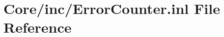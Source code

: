 \hypertarget{_error_counter_8inl}{}\section{Core/inc/\+Error\+Counter.inl File Reference}
\label{_error_counter_8inl}
